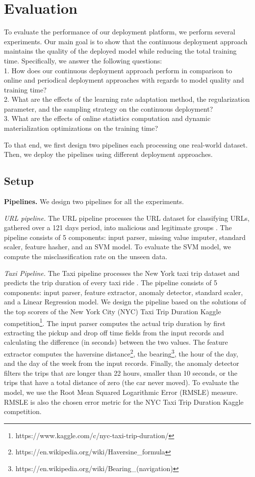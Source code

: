 \section{Evaluation} \label{evaluation} 
To evaluate the performance of our deployment platform, we perform several experiments.
Our main goal is to show that the continuous deployment approach maintains the quality of the deployed model while reducing the total training time.
Specifically, we answer the following questions:\\
1. How does our continuous deployment approach perform in comparison to online and periodical deployment approaches with regards to model quality and training time? \\
2. What are the effects of the learning rate adaptation method, the regularization parameter, and the sampling strategy on the continuous deployment? \\
3. What are the effects of online statistics computation and dynamic materialization optimizations on the training time?

To that end, we first design two pipelines each processing one real-world dataset.
Then, we deploy the pipelines using different deployment approaches.

\subsection{Setup}\label{subsec:setup}
\textbf{Pipelines.}
We design two pipelines for all the experiments.

\textit{URL pipeline.} The URL pipeline processes the URL dataset for classifying URLs, gathered over a 121 days period, into malicious and legitimate groups \cite{ma2009identifying}.
The pipeline consists of 5 components: input parser, missing value imputer, standard scaler, feature hasher, and an SVM model.
To evaluate the SVM model, we compute the misclassification rate on the unseen data.

\textit{Taxi Pipeline.} The Taxi pipeline processes the New York taxi trip dataset and predicts the trip duration of every taxi ride \cite{newyork-taxi}. 
The pipeline consists of 5 components: input parser, feature extractor, anomaly detector, standard scaler, and a Linear Regression model.
We design the pipeline based on the solutions of the top scorers of the New York City (NYC) Taxi Trip Duration Kaggle competition\footnote{https://www.kaggle.com/c/nyc-taxi-trip-duration/}. 
The input parser computes the actual trip duration by first extracting the pickup and drop off time fields from the input records and calculating the difference (in seconds) between the two values.
The feature extractor computes the haversine distance\footnote{https://en.wikipedia.org/wiki/Haversine\_formula}, the bearing\footnote{https://en.wikipedia.org/wiki/Bearing\_(navigation)}, the hour of the day, and the day of the week from the input records. 
Finally, the anomaly detector filters the trips that are longer than 22 hours, smaller than 10 seconds, or the trips that have a total distance of zero (the car never moved).
To evaluate the model, we use the Root Mean Squared Logarithmic Error (RMSLE) measure.
RMSLE is also the chosen error metric for the NYC Taxi Trip Duration Kaggle competition.

